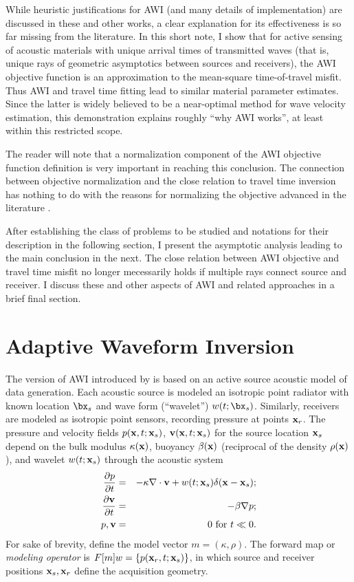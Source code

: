 While heuristic justifications for AWI (and
many details of implementation) are discussed in these and other
works, a clear explanation for its effectiveness is 
so far missing from the literature. In this short note, I show that
for active sensing of acoustic materials with unique arrival times of
transmitted waves
(that is, unique rays of geometric asymptotics between sources and
receivers), the AWI objective function is an approximation to the
mean-square time-of-travel misfit. Thus AWI and travel time fitting
lead to similar material parameter estimates. Since the latter is
widely believed to be a near-optimal method for wave velocity
estimation, this demonstration explains roughly ``why AWI works'', at
least within this restricted scope.

The reader will
note that a normalization component of the AWI objective function
definition is very
important in reaching this conclusion. The connection between
objective normalization and the close relation to travel time
inversion has nothing to do with
the reasons for normalizing the objective advanced in the
literature \cite[]{Warner:16,LiAlkhalifah:21}.

After establishing
the class of problems to be studied and notations for their
description in the following section, I present the asymptotic
analysis leading to the main conclusion in the next. The close relation
between AWI objective and travel time misfit no longer mecessarily
holds if multiple rays connect source and receiver. I discuss these
and other aspects of AWI and related approaches in a brief final section.

\section{Adaptive Waveform Inversion}

The version of AWI introduced by \cite{Warner:16} is based on an
active source acoustic model of data generation. Each acoustic source
is modeled an isotropic point radiator with known location $\bx_s$ and
wave form (``wavelet'') $w(t;\bx_s)$. Similarly, receivers are modeled
as isotropic point sensors, recording pressure at points ${\bf x}_r$. The pressure and velocity fields $p({\bf x},t;{\bf x}_s)$, ${\bf v}({\bf x},t;{\bf x}_s)$ for the source location ${\bf x}_s$ depend on the bulk modulus $\kappa({\bf x})$, buoyancy $\beta({\bf x})$ (reciprocal of the density $\rho({\bf x})$), and wavelet $w(t;{\bf x}_s)$ through the acoustic system
\begin{eqnarray}
  \label{eqn:awe}
 \frac{\partial p}{\partial t} & = &- \kappa \nabla \cdot {\bf v} +
w(t;{\bf x}_s) \delta({\bf x}-{\bf x}_s); \nonumber \\
\frac{\partial {\bf v}}{\partial t} & = & - \beta \nabla p; \\ 
p, {\bf v} & = & 0 \mbox{ for }  t \ll 0.
\end{eqnarray}
For sake of brevity, define the model vector $m=(\kappa,\rho)$. The forward map or {\em modeling operator} is $F[m]w = \{p({\bf x}_r,t;{\bf x}_s)\}$, in which source and receiver positions ${\bf x}_s, {\bf x}_r$ define the acquisition geometry.

